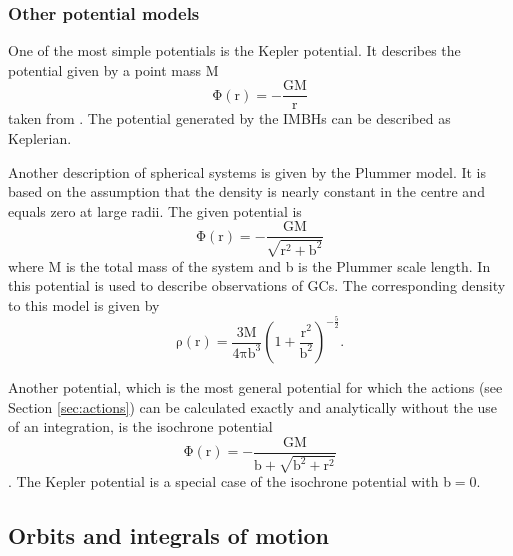 \subsubsection{Other potential models}\label{sec:other_pot}
One of the most simple potentials is the Kepler potential. It describes the potential given by a point mass M
\begin{equation}\label{eq:kep_pot}
\mathrm{\Phi(r)=-\frac{GM}{r}}
\end{equation}  taken from \citet[eq. 2.34]{2008gady.book.....B}. The potential generated by the \acp{IMBH} can be described  as Keplerian. 
\par Another description of spherical systems is given by the Plummer model. It is based on the assumption that the density is nearly constant in the centre and equals zero at large radii. The given potential is 
\begin{equation}\label{eq:Plum_pot}
\mathrm{\Phi(r)=-\frac{GM}{\sqrt{r^2+b^2}}}
\end{equation}
\citep[eq. 2.44a]{2008gady.book.....B} where M is the total mass of the system and b is the Plummer scale length. In \citet{1911MNRAS..71..460P} this potential is used to describe observations of \acp{GC}. The corresponding density to this model is given by \citet[eq. 2.44b]{2008gady.book.....B}
\begin{equation}\label{eq:Plumm_dens}
\mathrm{\rho(r)=\frac{3M}{4\pi b^3}\left(1+\frac{r^2}{b^2}\right)^{-\frac{5}{2}}.}
\end{equation} 
\par Another potential, which is the most general potential for which the actions (see Section \ref{sec:actions}) can be calculated exactly and analytically without the use of an integration, is the isochrone potential
\begin{equation}\label{eq:isochr_pot}
\mathrm{\Phi(r)=-\frac{GM}{b+\sqrt{b^2+r^2}}}
\end{equation} 
\citep[eq. 2.47]{2008gady.book.....B}. The Kepler potential is a special case of the isochrone potential with b$=0$. 
\subsection{Orbits and integrals of motion}\label{sec:orbit_int_of_motion_theory}
